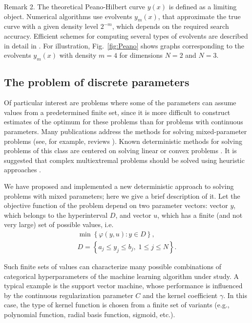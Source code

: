 \documentclass[preprint,12pt]{elsarticle}
\begin{document}
Remark 2. The theoretical Peano-Hilbert curve $y(x)$ is defined as a limiting object. Numerical algorithms use evolvents $y_m(x)$, that approximate the true curve with a given density level $2^{-m}$, which depends on the required search accuracy. Efficient schemes for computing several types of evolvents are described in detail in \cite{Sergeyev2013}. For illustration, Fig.~\ref{fig:Peano} shows graphs corresponding to the evolvents $y_m(x)$ with density $m=4$ for dimensions $N=2$ and $N=3$.

\subsection{The problem of discrete parameters}
\label{sec_discr} 

Of particular interest are problems where some of the parameters can assume values from a predetermined finite set, since it is more difficult to construct estimates of the optimum for these problems than for problems with continuous parameters. Many publications address the methods for solving mixed-parameter problems (see, for example, reviews \cite{Burer2012,Boukouvala2016}). Known deterministic methods for solving problems of this class are centered on solving linear or convex problems \cite{Lee2012}. It is suggested that complex multiextremal problems should be solved using heuristic approaches \cite{Belotti2013}. 

We have proposed and implemented a new deterministic approach to solving problems with mixed parameters; here we give a brief description of it. 
Let the objective function of the problem depend on two parameter vectors: vector $y$, which belongs to the hyperinterval $D$, and vector $u$, which has a finite (and not very large) set of possible values, i.e.
\begin{gather}\label{problem_i}
\min{\left\{ \varphi(y,u) : y\in D \right\}},\\
D=\left\{a_j \leq y_j \leq b_j, \; 1\leq j \leq N \right\}.\nonumber
\end{gather}

Such finite sets of values can characterize many possible combinations of categorical hyperparameters of the machine learning algorithm under study. A typical example is the support vector machine, whose performance is influenced by the continuous regularization parameter $C$ and the kernel coefficient $\gamma$. In this case, the type of kernel function is chosen from a finite set of variants (e.g., polynomial function, radial basis function, sigmoid, etc.). 
\end{document}

